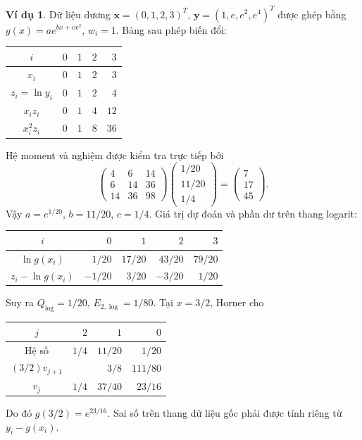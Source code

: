 \documentclass[12pt,a4paper,oneside]{book}
\numberwithin{algorithm}{chapter}
\theoremstyle{definition}
\newtheorem{vidu}{Ví dụ}[chapter]
\begin{document}
\begin{vidu}
Dữ liệu dương $\boldsymbol x=(0,1,2,3)^T$, $\boldsymbol y=(1,e,e^2,e^4)^T$ được ghép bằng $g(x)=a e^{bx+cx^2}$, $w_i=1$. Bảng sau phép biến đổi:
\begin{center}
\begin{tabular}{c|rrrr}\toprule
$i$&$0$&$1$&$2$&$3$\\\midrule
$x_i$&$0$&$1$&$2$&$3$\\
$z_i=\ln y_i$&$0$&$1$&$2$&$4$\\
$x_i z_i$&$0$&$1$&$4$&$12$\\
$x_i^2z_i$&$0$&$1$&$8$&$36$\\\bottomrule
\end{tabular}
\end{center}
Hệ moment và nghiệm được kiểm tra trực tiếp bởi
\[
 \begin{pmatrix}4&6&14\\6&14&36\\14&36&98\end{pmatrix}
 \begin{pmatrix}1/20\\11/20\\1/4\end{pmatrix}
 =\begin{pmatrix}7\\17\\45\end{pmatrix}.
\]
Vậy $a=e^{1/20}$, $b=11/20$, $c=1/4$. Giá trị dự đoán và phần dư trên thang logarit:
\begin{center}
\begin{tabular}{c|rrrr}\toprule
$i$&$0$&$1$&$2$&$3$\\\midrule
$\ln g(x_i)$&$1/20$&$17/20$&$43/20$&$79/20$\\
$z_i-\ln g(x_i)$&$-1/20$&$3/20$&$-3/20$&$1/20$\\\bottomrule
\end{tabular}
\end{center}
Suy ra $Q_{\log}=1/20$, $E_{2,\log}=1/80$. Tại $x=3/2$, Horner cho
\begin{center}
\begin{tabular}{c|rrr}\toprule
$j$&$2$&$1$&$0$\\\midrule
Hệ số&$1/4$&$11/20$&$1/20$\\
$(3/2)v_{j+1}$&&$3/8$&$111/80$\\
$v_j$&$1/4$&$37/40$&$\boxed{23/16}$\\\bottomrule
\end{tabular}
\end{center}
Do đó $g(3/2)=e^{23/16}$. Sai số trên thang dữ liệu gốc phải được tính riêng từ $y_i-g(x_i)$.
\end{vidu}
\end{document}
